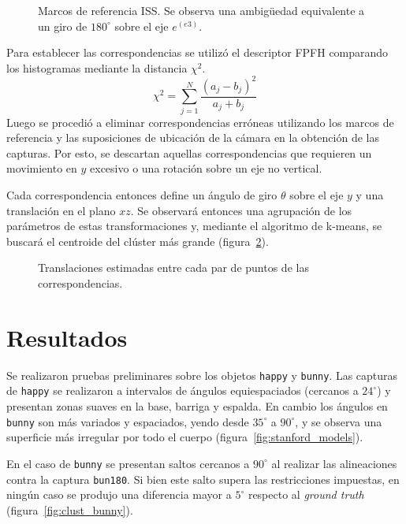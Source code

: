 		\begin{figure}
			\caption{\label{fig:marco_referencia_iss}Marcos de referencia ISS. Se observa una ambigüedad equivalente a un giro de $180^{\circ}$ sobre el eje $e^{(e3)}$.}
		\end{figure}

		Para establecer las correspondencias se utilizó el descriptor FPFH
		comparando los histogramas mediante la distancia $\chi^2$.
		\[ \chi^2 = \sum_{j=1}^{N} \frac{\left(a_j - b_j\right)^2}{a_j + b_j} \]
		Luego se
		procedió a eliminar correspondencias erróneas utilizando los marcos de
		referencia y las suposiciones de ubicación de la cámara en la obtención
		de las capturas.  Por esto, se descartan aquellas correspondencias que
		requieren un movimiento en $y$ excesivo o una rotación sobre un eje no
		vertical. 

		Cada correspondencia entonces define un ángulo de giro $\theta$ sobre
		el eje $y$ y una translación en el plano $xz$.  Se observará entonces
		una agrupación de los parámetros de estas transformaciones y, mediante el
		algoritmo de k-means, se buscará el centroide del clúster más grande (figura~\ref{fig:cluster}).
		\begin{figure}
			\resizebox{.9\linewidth}{!}{}
			\caption{\label{fig:cluster}Translaciones estimadas entre cada par
			de puntos de las correspondencias.}
		\end{figure}

		\section{Resultados}

			Se realizaron pruebas preliminares sobre los objetos \texttt{happy} y \texttt{bunny}.
			Las capturas de \texttt{happy} se realizaron a intervalos de ángulos equiespaciados (cercanos a $24^{\circ}$) y
			presentan zonas suaves en la base, barriga y espalda.
			En cambio los ángulos en \texttt{bunny} son más variados y espaciados, yendo desde $35^{\circ}$ a $90^{\circ}$,
			y se observa una superficie más irregular por todo el cuerpo (figura~\ref{fig:stanford_models}). 


			En el caso de \texttt{bunny} se presentan saltos cercanos a $90^{\circ}$ al realizar las alineaciones
			contra la captura \texttt{bun180}. Si bien este salto supera las restricciones impuestas,
			en ningún caso se produjo una diferencia mayor a $5^{\circ}$ respecto al \emph{ground truth} (figura~\ref{fig:clust_bunny}).


